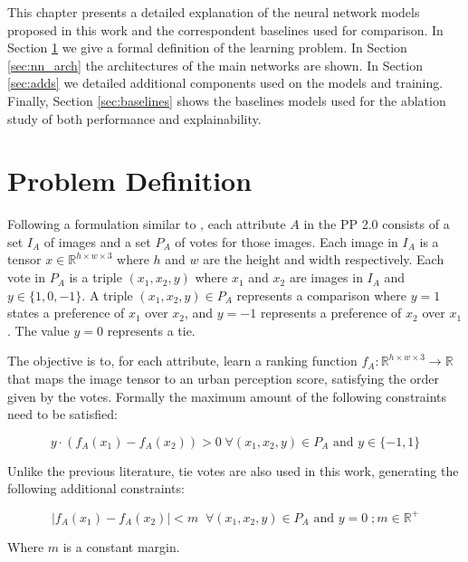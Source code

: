 This chapter presents a detailed explanation of the neural network models proposed in this work and
the correspondent baselines used for comparison. In Section \ref{sec:problem_def} we give a formal definition
of the learning problem. In Section \ref{sec:nn_arch} the architectures of
the main networks are shown. In Section \ref{sec:adds} we detailed additional components used on the models and training.
Finally, Section \ref{sec:baselines} shows the baselines models
used for the ablation study of both performance and explainability.


\section{Problem Definition}
\label{sec:problem_def}

Following a formulation similar to , each attribute $A$ in the PP 2.0
consists of a set $I_A$ of images and a set $P_A$ of votes for those images.
Each image in $I_A$ is a tensor $x \in \mathbb{R}^{h \times w \times 3}$ where $h$ and $w$ are the height and width respectively.
Each vote in $P_A$ is a triple $(x_1,x_2,y)$ where $x_1$ and $x_2$ are images in $I_A$ and $y\in \{1,0,-1\}$.
A triple $(x_1,x_2,y)\in P_A$ represents a comparison where $y=1$ states a preference of $x_1$ over $x_2$, and $y=-1$
represents a preference of $x_2$ over $x_1$. The value $y=0$ represents a tie.

The objective is to, for each attribute, learn a ranking function $f_A : \mathbb{R}^{h \times w \times 3} \rightarrow \mathbb{R}$
that maps the image tensor to an urban perception score, satisfying the order given by the votes. Formally the
maximum amount of the following constraints need to be satisfied:

\begin{equation}
	y \cdot (f_A(x_1) - f_A(x_2)) > 0 \;  \forall (x_1,x_2,y) \in P_A\text{ and }y\in\{-1,1\}
	\label{eq:constraints}
\end{equation}

Unlike the previous literature, tie votes are also used in this work, generating the following additional constraints:

\begin{equation}
	|f_A(x_1) - f_A(x_2)| < m \;\; \forall (x_1,x_2,y) \in P_A\text{ and }y=0 \; ;  m \in \mathbb{R}^+
	\label{eq:constraints_ties}
\end{equation}

Where $m$ is a constant margin.

